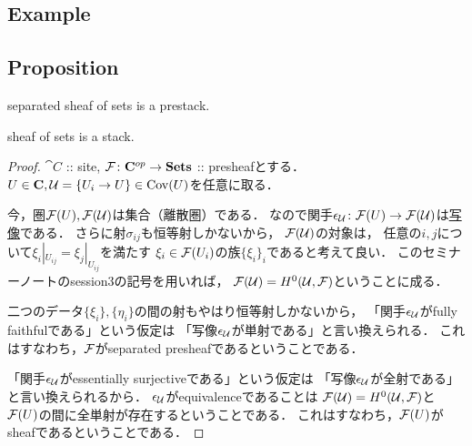\documentclass[a4paper]{jsarticle}
\begin{document}
\subsection{Example}

\subsection{Proposition}
\begin{Prop}
    \begin{myenum}
        \item separated sheaf of sets is a prestack.
        \item sheaf of sets is a stack.
    \end{myenum}
\end{Prop}
\begin{proof}
    $\cat{C}$ :: site, $\mathcal{F} \colon \mathbf{C}^{op} \to \mathbf{Sets}$ :: presheafとする．
    $U \in \mathbf{C}, \mathcal{U}=\{U_i \to U\} \in \operatorname{Cov}(U)$を任意に取る．

    今，圏$\mathcal{F}(U), \mathcal{F}(\mathcal{U})$は集合（離散圏）である．
    なので関手$\epsilon_{\mathcal{U}} \colon \mathcal{F}(U) \to \mathcal{F}(\mathcal{U})$は\underline{写像}である．
    さらに射$\sigma_{ij}$も恒等射しかないから，
    $\mathcal{F}(\mathcal{U})$の対象は，
    任意の$i,j$について$\xi_i|_{U_{ij}}=\xi_j|_{U_{ij}}$を満たす
    $\xi_i \in \mathcal{F}(U_i)$の族$\{\xi_i\}_i$であると考えて良い．
    このセミナーノートのsession3の記号を用いれば，
    $\mathcal{F}(\mathcal{U})=H^0(\mathcal{U}, \mathcal{F})$ということに成る．

    二つのデータ$\{\xi_i\}, \{\eta_i\}$の間の射もやはり恒等射しかないから，
    「関手$\epsilon_{\mathcal{U}}$がfully faithfulである」という仮定は
    「写像$\epsilon_{\mathcal{U}}$が単射である」と言い換えられる．
    これはすなわち，$\mathcal{F}$がseparated presheafであるということである．

    「関手$\epsilon_{\mathcal{U}}$がessentially surjectiveである」という仮定は
    「写像$\epsilon_{\mathcal{U}}$が全射である」と言い換えられるから．
    $\epsilon_{\mathcal{U}}$がequivalenceであることは
    $\mathcal{F}(\mathcal{U})=H^0(\mathcal{U}, \mathcal{F})$と$\mathcal{F}(U)$の間に全単射が存在するということである．
    これはすなわち，$\mathcal{F}(U)$がsheafであるということである．
\end{proof}



\end{document}
